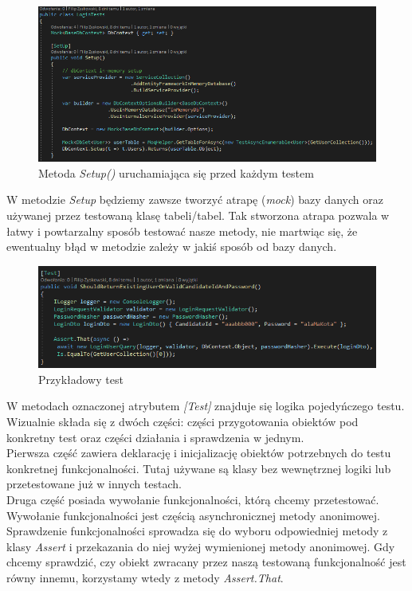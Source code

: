 \documentclass{article}
\begin{document}
\begin{figure}[H]
    \centering
    \includegraphics[width=1\linewidth]{images/setupTests.png}
    \caption{Metoda \emph{Setup()} uruchamiająca się przed każdym testem}
    \label{fig:test1_label}
\end{figure}

W metodzie \emph{Setup} będziemy zawsze tworzyć atrapę (\emph{mock}) bazy danych oraz używanej przez testowaną klasę tabeli/tabel. Tak stworzona atrapa pozwala w łatwy i powtarzalny sposób testować nasze metody, nie martwiąc się, że ewentualny błąd w metodzie zależy w jakiś sposób od bazy danych. \\

\begin{figure}[H]
    \centering
    \includegraphics[width=1\linewidth]{images/testMethod.png}
    \caption{Przykładowy test}
    \label{fig:test2_label}
\end{figure}

W metodach oznaczonej atrybutem \emph{[Test]} znajduje się logika pojedyńczego testu. Wizualnie składa się z dwóch części: części przygotowania obiektów pod konkretny test oraz części działania i sprawdzenia w jednym. \\
Pierwsza część zawiera deklarację i inicjalizację obiektów potrzebnych do testu konkretnej funkcjonalności. Tutaj używane są klasy bez wewnętrznej logiki lub przetestowane już w innych testach. \\
Druga część posiada wywołanie funkcjonalności, którą chcemy przetestować. Wywołanie funkcjonalności jest częścią asynchronicznej metody anonimowej.
Sprawdzenie funkcjonalności sprowadza się do wyboru odpowiedniej metody z klasy \emph{Assert} i przekazania do niej wyżej wymienionej metody anonimowej.
Gdy chcemy sprawdzić, czy obiekt zwracany przez naszą testowaną funkcjonalność jest równy innemu, korzystamy wtedy z metody \emph{Assert.That}.
\end{document}
